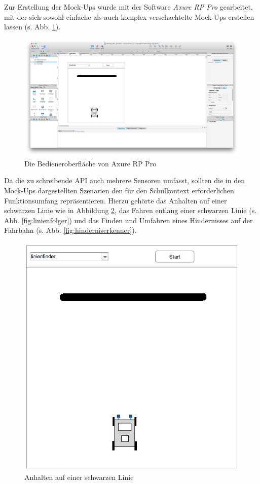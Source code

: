 \documentclass[paper=a4, DIV=calc, BCOR=12mm, twoside=on, onecolumn=on, open = right, titlepage =on, parskip =half-, headsepline = on, footsepline = off, chapterprefix = off, appendixprefix = on, fontsize = 12pt, numbers = noenddot, abstract = on]{scrbook}
\begin{document}
Zur Erstellung der Mock-Ups wurde mit der Software \emph{Axure RP Pro} gearbeitet, mit der sich sowohl einfache als auch komplex verschachtelte Mock-Ups erstellen lassen (s. Abb. \ref{fig:axure}).

\begin{figure}[htbp]
\centering
\includegraphics[width=\textwidth]{images/axure_mockup.png} 
\caption{Die Bedieneroberfläche von Axure RP Pro}
\label{fig:axure}
\end{figure}

Da die zu schreibende API auch mehrere Sensoren umfasst, sollten die in den Mock-Ups dargestellten Szenarien den für den Schulkontext erforderlichen Funktionsumfang repräsentieren. Hierzu gehörte das Anhalten auf einer schwarzen Linie wie in Abbildung \ref{fig:linienfinder}, das Fahren entlang einer schwarzen Linie (s. Abb. \ref{fig:linienfolger}) und das Finden und Umfahren eines Hindernisses auf der Fahrbahn (s. Abb. \ref{fig:hinderniserkenner}).

\begin{figure}[htbp]
\centering
\includegraphics[scale=0.5]{images/mockup_linienfinder.png}
\caption{Anhalten auf einer schwarzen Linie}
\label{fig:linienfinder}
\end{figure}
\end{document}
